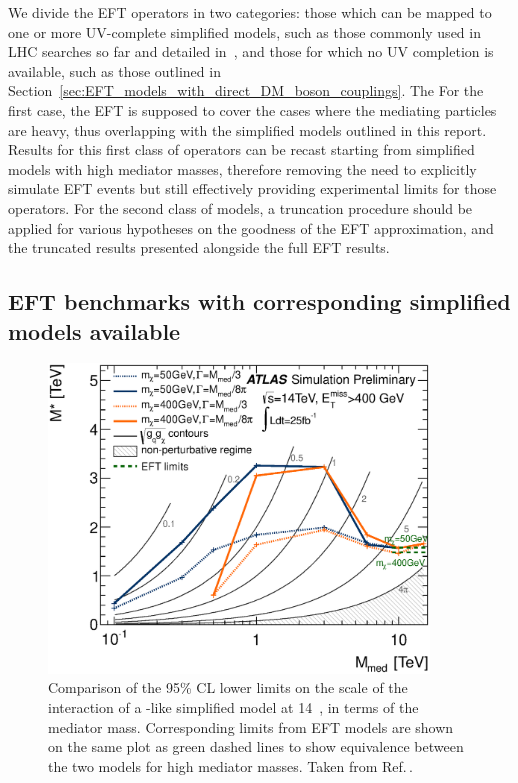 We divide the EFT operators in two categories: 
those which can be mapped to one or more UV-complete simplified models, such as those
commonly used in LHC searches so far and detailed in~\cite{Goodman:2010ku}, and those
for which no UV completion is available, such as those outlined in Section~\ref{sec:EFT_models_with_direct_DM_boson_couplings}. The For the first case, the EFT is supposed to cover the cases where the mediating particles are heavy,
thus overlapping with the simplified models outlined in this report.
Results for this first class of operators can be recast starting from simplified models with high mediator masses, 
therefore removing the need to explicitly simulate EFT events but still effectively providing experimental limits
for those operators. For the second class of models, a truncation procedure 
should be applied for various hypotheses on the goodness of the EFT approximation, 
and the truncated results presented alongside the full EFT results.

\subsection{EFT benchmarks with corresponding simplified models available}

\begin{figure}
\centering
\includegraphics[width=0.9\textwidth]{figures/monojet/lambda_14TeV_SR1.eps}
\caption{Comparison of the 95\% CL lower limits on the scale of the interaction of a \Zprime-like simplified model at 14~\tev, in terms of the mediator mass. Corresponding limits from EFT models are shown on the same plot as green dashed lines to show equivalence between the two models for high mediator masses.
Taken from Ref.\,\cite{ATL-PHYS-PUB-2014-007}.}
\label{fig:monojet_MstarMmed}
\end{figure}

